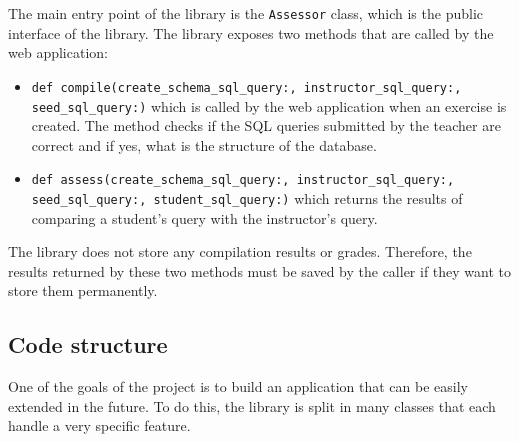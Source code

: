 The main entry point of the library is the \texttt{Assessor} class, which is the public interface of the library. The library exposes two methods that are called by the web application:
\begin{itemize}
    \item \texttt{def compile(create_schema_sql_query:, instructor_sql_query:, seed_sql_query:)} which is called by the web application when an exercise is created. The method checks if the SQL queries submitted by the teacher are correct and if yes, what is the structure of the database.
    \item \texttt{def assess(create_schema_sql_query:, instructor_sql_query:, seed_sql_query:, student_sql_query:)} which returns the results of comparing a student's query with the instructor's query.
\end{itemize}

The library does not store any compilation results or grades. Therefore, the results returned by these two methods must be saved by the caller if they want to store them permanently.

\subsection{Code structure}

One of the goals of the project is to build an application that can be easily extended in the future. To do this, the library is split in many classes that each handle a very specific feature.

